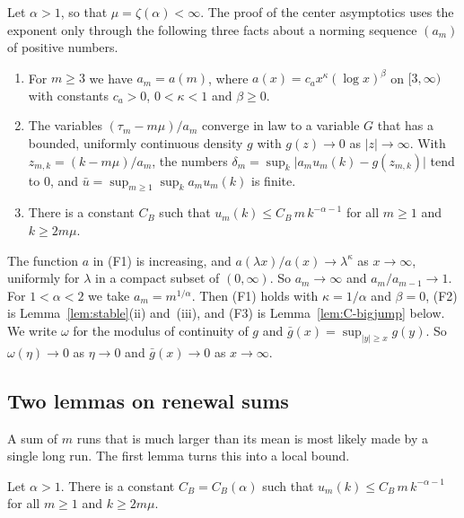 Let $\alpha>1$, so that $\mu=\zeta(\alpha)<\infty$. The proof of the center asymptotics uses
the exponent only through the following three facts about a norming sequence $(a_m)$ of
positive numbers.
\begin{enumerate}[(F1)]
\item For $m\ge3$ we have $a_m=a(m)$, where $a(x)=c_ax^{\kappa}(\log x)^{\beta}$ on
$[3,\infty)$ with constants $c_a>0$, $0<\kappa<1$ and $\beta\ge0$.
\item The variables $(\tau_m-m\mu)/a_m$ converge in law to a variable $G$ that has a
bounded, uniformly continuous density $g$ with $g(z)\to0$ as $\lvert z\rvert\to\infty$.
With $z_{m,k}=(k-m\mu)/a_m$, the numbers
$\delta_m=\sup_k\lvert a_mu_m(k)-g(z_{m,k})\rvert$ tend to $0$, and
$\bar u=\sup_{m\ge1}\sup_ka_mu_m(k)$ is finite.
\item There is a constant $C_B$ such that $u_m(k)\le C_B\,m\,k^{-\alpha-1}$ for all
$m\ge1$ and $k\ge2m\mu$.
\end{enumerate}
The function $a$ in (F1) is increasing, and $a(\lambda x)/a(x)\to\lambda^\kappa$ as
$x\to\infty$, uniformly for $\lambda$ in a compact subset of $(0,\infty)$. So
$a_m\to\infty$ and $a_m/a_{m-1}\to1$. For $1<\alpha<2$ we take $a_m=m^{1/\alpha}$. Then
(F1) holds with $\kappa=1/\alpha$ and $\beta=0$, (F2) is Lemma~\ref{lem:stable}(ii)
and~(iii), and (F3) is Lemma~\ref{lem:C-bigjump} below. We write $\omega$ for the modulus
of continuity of $g$ and $\bar g(x)=\sup_{\lvert y\rvert\ge x}g(y)$. So
$\omega(\eta)\to0$ as $\eta\to0$ and $\bar g(x)\to0$ as $x\to\infty$.

\subsection{Two lemmas on renewal sums}

A sum of $m$ runs that is much larger than its mean is most likely made by a single long
run. The first lemma turns this into a local bound.

\begin{lemma}\label{lem:C-bigjump}
Let $\alpha>1$. There is a constant $C_B=C_B(\alpha)$ such that
$u_m(k)\le C_B\,m\,k^{-\alpha-1}$ for all $m\ge1$ and $k\ge2m\mu$.
\end{lemma}

